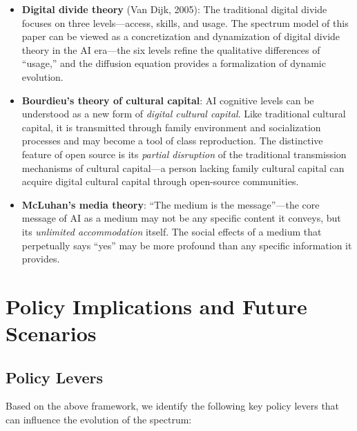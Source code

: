 ﻿\documentclass[12pt,a4paper]{article}
\begin{document}
\begin{itemize}
\item \textbf{Digital divide theory} (Van Dijk, 2005): The traditional digital divide focuses on three levels---access, skills, and usage. The spectrum model of this paper can be viewed as a concretization and dynamization of digital divide theory in the AI era---the six levels refine the qualitative differences of ``usage,'' and the diffusion equation provides a formalization of dynamic evolution.
\item \textbf{Bourdieu's theory of cultural capital}: AI cognitive levels can be understood as a new form of \emph{digital cultural capital}. Like traditional cultural capital, it is transmitted through family environment and socialization processes and may become a tool of class reproduction. The distinctive feature of open source is its \emph{partial disruption} of the traditional transmission mechanisms of cultural capital---a person lacking family cultural capital can acquire digital cultural capital through open-source communities.
\item \textbf{McLuhan's media theory}: ``The medium is the message''---the core message of AI as a medium may not be any specific content it conveys, but its \emph{unlimited accommodation} itself. The social effects of a medium that perpetually says ``yes'' may be more profound than any specific information it provides.
\end{itemize}

\section{Policy Implications and Future Scenarios}

\subsection{Policy Levers}

Based on the above framework, we identify the following key policy levers that can influence the evolution of the spectrum:
\end{document}
